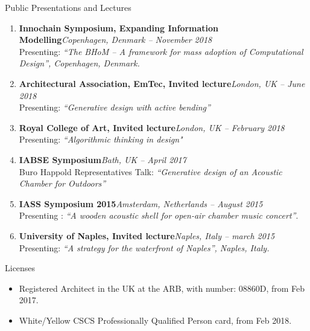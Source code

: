 \documentclass{resume}
\begin{document}
\begin{rSection}{Public Presentations and Lectures}
    \begin{enumerate}[leftmargin=0.45cm, itemsep=0em, topsep=0.5em, parsep=0.2em]
        \item \textbf{Innochain Symposium, Expanding Information Modelling}\hfill            \textit{Copenhagen, Denmark -- November 2018} \\
            Presenting: \textit{“The BHoM – A framework for mass adoption of Computational Design”, Copenhagen, Denmark.}

        \item \textbf{Architectural Association, EmTec, Invited lecture}\hfill             \textit{London, UK -- June 2018} \\
            Presenting: \textit{“Generative design with active bending”}

        \item \textbf{Royal College of Art, Invited lecture}\hfill \textit{London, UK -- February 2018} \\
            Presenting: \textit{“Algorithmic thinking in design"}

        \item \textbf{IABSE Symposium}\hfill \textit{Bath, UK -- April 2017} \\
            Buro Happold Representatives Talk: \textit{“Generative design of an Acoustic Chamber for Outdoors”}

        \item \textbf{IASS Symposium 2015}\hfill \textit{Amsterdam, Netherlands -- August 2015} \\
        Presenting : \textit{“A wooden acoustic shell for open-air chamber music concert”}.

        \item \textbf{University of Naples, Invited lecture}\hfill \textit{Naples, Italy -- march 2015} \\
    	Presenting: \textit{“A strategy for the waterfront of Naples”, Naples, Italy.}

    \end{enumerate}
\end{rSection}

\begin{rSection}{Licenses}
    \begin{itemize}[leftmargin=0.45cm, itemsep=0em, topsep=0.5em, parsep=0.2em]
        \item Registered Architect in the UK at the ARB, with number: 08860D, from Feb 2017.
        \item White/Yellow CSCS Professionally Qualified Person card, from Feb 2018.
    \end{itemize}
\end{rSection}
\end{document}
